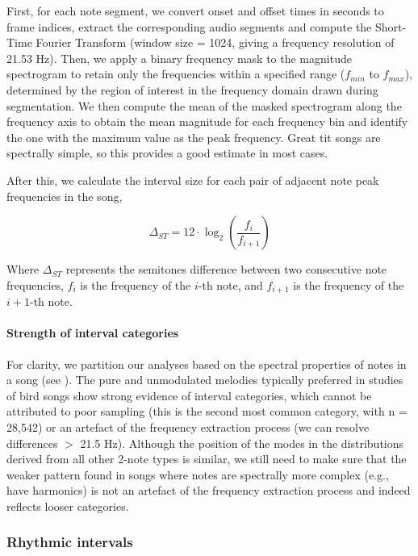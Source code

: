 First, for each note segment, we convert onset and offset times in seconds to frame indices, extract the corresponding audio segments and compute the Short-Time Fourier Transform (window size = 1024, giving a frequency resolution of 21.53 Hz). Then, we apply a binary frequency mask to the magnitude spectrogram to retain only the frequencies within a specified range ($f_{min}$ to $f_{max}$), determined by the region of interest in the frequency domain drawn during segmentation. We then compute the mean of the masked spectrogram along the frequency axis to obtain the mean magnitude for each frequency bin and identify the one with the maximum value as the peak frequency. Great tit songs are spectrally simple, so this provides a good estimate in most cases.

\noindent After this, we calculate the interval size for each pair of adjacent note peak frequencies in the song,

\begin{equation}
\Delta_{ST} = 12 \cdot \log_2\left(\frac{f_{i}}{f_{i+1}}\right)
\end{equation}

\noindent Where $\Delta_{ST}$ represents the semitones difference between two consecutive note frequencies, $f_{i}$ is the frequency of the $i$-th note, and $f_{i+1}$ is the frequency of the $i+1$-th note.


\paragraph{Strength of interval categories}
\label{c5:strength}
For clarity, we partition our analyses based on the spectral properties of notes in a song (see ). The pure and unmodulated melodies typically preferred in studies of bird songs \autocite{dobson1977, tierney2011a, doolittle2012, doolittle2014} show strong evidence of interval categories, which cannot be attributed to poor sampling (this is the second most common category, with n = 28,542) or an artefact of the frequency extraction process (we can resolve differences $>$ 21.5 Hz). Although the position of the modes in the distributions derived from all other 2-note types is similar, we still need to make sure that the weaker pattern found in songs where notes are spectrally more complex (e.g., have harmonics) is not an artefact of the frequency extraction process and indeed reflects looser categories.

\subsubsection{Rhythmic intervals}

